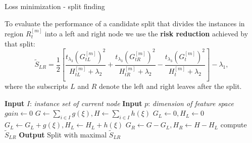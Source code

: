\documentclass[11pt,compress,t,notes=noshow, xcolor=table]{beamer}
\begin{document}
\begin{vbframe}{Loss minimization - split finding}

    To evaluate the performance of a candidate split that divides the instances in region $R_t^{[m]}$ into a left and right node we use the \textbf{risk reduction} achieved by that split:
    $$
    \tilde S_{LR} =
     \frac12 \left[
     \frac{t_{\lambda_3} \left( G^{[m]}_{tL} \right)^2}{H^{[m]}_{tL} + \lambda_2} + \frac{t_{\lambda_3}\left(G^{[m]}_{tR}\right)^2}{H^{[m]}_{tR} + \lambda_2} - \frac{t_{\lambda_3}\left(G^{[m]}_{t}\right)^2}{H^{[m]}_{t} + \lambda_2}
     \right] - \lambda_1,
    $$
    where the subscripts $L$ and $R$ denote the left and right leaves after the split.


    \lz

    \framebreak

    \begin{algorithm}[H]

    \begin{footnotesize}
    \begin{center}

      \begin{algorithmic}[1]
        \State \textbf{Input} $I$: \emph{instance set of current node}
        \State \textbf{Input} $p$: \emph{dimension of feature space}
        \State $gain \gets 0$
        \State $G \gets \sum_{i \in I} g(\xi), {H} \gets \sum_{i \in I} h(\xi)$
          \State $G_L \gets 0, {H}_L \gets 0$
            \State ${G}_L \gets {G}_L + g(\xi), {H}_L \gets {H}_L + h(\xi)$
            \State ${G}_R \gets G - {G}_L, {H}_R \gets {H} - {H}_L$
            \State compute $\tilde S_{LR}$
          \EndFor
        \EndFor
        \State \textbf{Output} Split with maximal $\tilde S_{LR}$
      \end{algorithmic}
    \end{center}
    \end{footnotesize}
    \caption{(Exact) Algorithm for split finding}
    \end{algorithm}

    \end{vbframe}

    \endlecture
\end{document}
